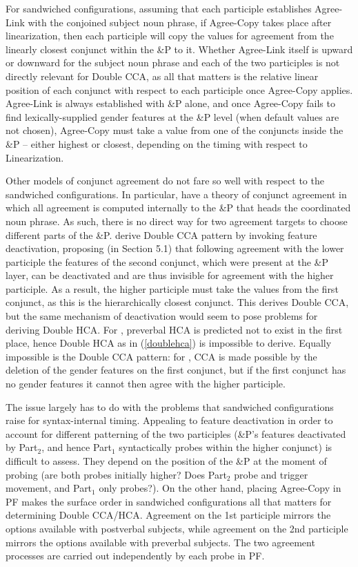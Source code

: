 \documentclass[output=paper
,modfonts
,nonflat]{langsci/langscibook}
\begin{document}
For sandwiched configurations, assuming that each participle establishes Agree-Link with the conjoined subject noun phrase, if Agree-Copy takes place after linearization, then each participle will copy the values for agreement from the linearly closest conjunct within the \&P to it. Whether Agree-Link itself is upward or downward for the subject noun phrase and each of the two participles is not directly relevant for Double CCA, as all that matters is the relative linear position of each conjunct with respect to each participle once Agree-Copy applies. Agree-Link is always established with \&P alone, and once Agree-Copy fails to find lexically-supplied gender features at the \&P level (when default values are not chosen), Agree-Copy must take a value from one of the conjuncts inside the \&P -- either highest or closest, depending on the timing with respect to Linearization.

Other models of conjunct agreement do not fare so well with respect to the sandwiched configurations. In particular, \citet{puskarmurphy:17} have a theory of conjunct agreement in which all agreement is computed internally to the \&P that heads the coordinated noun phrase. As such, there is no direct way for two agreement targets to choose different parts of the \&P. 
\citet{puskarmurphy:17} derive Double CCA pattern by invoking feature deactivation, proposing (in Section 5.1) that following agreement with the lower participle the features of the second conjunct, which were present at the \&P layer, can be deactivated and are thus invisible for agreement with the higher participle. As a result, the higher participle must take the values from the first conjunct, as this is the hierarchically closest conjunct. This derives Double CCA, but the same mechanism of deactivation would seem to pose problems for deriving Double HCA. For \citet{boskovic:09}, preverbal HCA is predicted not to exist in the first place, hence Double HCA as in (\ref{doublehca}) is impossible to derive. Equally impossible is the Double CCA pattern: for \cite{boskovic:09}, CCA is made possible by the deletion of the gender features on the first conjunct, but if the first conjunct has no gender features it cannot then agree with the higher participle.

The issue largely has to do with the problems that sandwiched configurations raise for syntax-internal timing. Appealing to feature deactivation in order to account for different patterning of the two participles (\&P’s features deactivated by Part$_2$, and hence Part$_1$ syntactically probes within the higher conjunct) is difficult to assess. They depend on the position of the \&P at the moment of probing (are both probes initially higher? Does Part$_2$ probe and trigger movement, and Part$_1$ only probes?). On the other hand, placing Agree-Copy in PF makes the surface order in sandwiched configurations all that matters for determining Double CCA/HCA. Agreement on the 1st participle mirrors the options available with postverbal subjects, while agreement on the 2nd participle mirrors the options available with preverbal subjects. The two agreement processes are carried out independently by each probe in PF.
\end{document}
